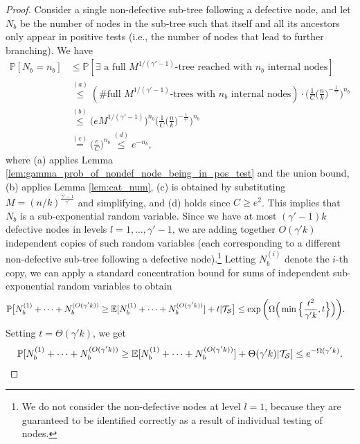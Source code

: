 \begin{proof}
Consider a single non-defective sub-tree following a defective node, and let $N_b$ be the number of nodes in the sub-tree such that itself and all its ancestors only appear in positive tests (i.e., the number of nodes that lead to further branching).  We have
\begin{align}
    \mathbb{P}[N_b=n_b]&\leq\mathbb{P}[\exists\text{ a full $M^{1/(\gamma'-1)}$-tree reached with $n_b$ internal nodes}] \\
    &\stackrel{(a)}{\leq}(\text{\#full $M^{1/(\gamma'-1)}$-trees with $n_b$ internal nodes})\cdot\bigg(\frac{1}{C}\Big(\frac{n}{k}\Big)^{-\frac{1}{\gamma'}}\bigg)^{n_b} \\
    &\stackrel{(b)}{\leq}\big(eM^{1/(\gamma'-1)}\big)^{n_b}\bigg(\frac{1}{C}\Big(\frac{n}{k}\Big)^{-\frac{1}{\gamma'}}\bigg)^{n_b} \\
    &\stackrel{(c)}{=}\Big(\frac{e}{C}\Big)^{n_b}
    \stackrel{(d)}{\leq}e^{-n_b},
\end{align}
where (a) applies Lemma \ref{lem:gamma_prob_of_nondef_node_being_in_pos_test} and the union bound, (b) applies Lemma \ref{lem:cat_num}, (c) is obtained by substituting $M=(n/k)^{\frac{\gamma'-1}{\gamma'}}$ and simplifying, and (d) holds since $C\geq e^2$. This implies that $N_b$ is a sub-exponential random variable. Since we have at most $(\gamma'-1)k$ defective nodes in levels $l=1,\dots,\gamma'-1$, we are adding together $O(\gamma'k)$ independent copies of such random variables (each corresponding to a different non-defective sub-tree following a defective node).\footnote{We do not consider the non-defective nodes at level $l=1$, because they are guaranteed to be identified correctly as a result of individual testing of nodes.} Letting $N_b^{(i)}$ denote the $i$-th copy, we can apply a standard concentration bound for sums of independent sub-exponential random variables \cite[Prop. 5.16]{Ver12} to obtain 
\begin{align}
    \mathbb{P}\big[N_b^{(1)}+\dots+N_b^{(O(\gamma'k))}&\geq\mathbb{E}[N_b^{(1)}+\dots+N_b^{(O(\gamma'k))}]+t|\mathcal{T}_\mathcal{S}\big]\leq\exp\bigg(\Omega\Big(\min\Big\{\frac{t^2}{\gamma'k},t\Big\}\Big)\bigg).
\end{align}
Setting $t=\Theta(\gamma'k)$, we get
\begin{align}
    \mathbb{P}[N_b^{(1)}+\dots+N_b^{(O(\gamma'k))}\geq\mathbb{E}[N_b^{(1)}+\dots+N_b^{(O(\gamma'k))}]+\Theta(\gamma'k)|\mathcal{T}_\mathcal{S}]\leq e^{-\Omega(\gamma'k)}. \label{eq:N_conc}
\end{align}

\end{proof}

